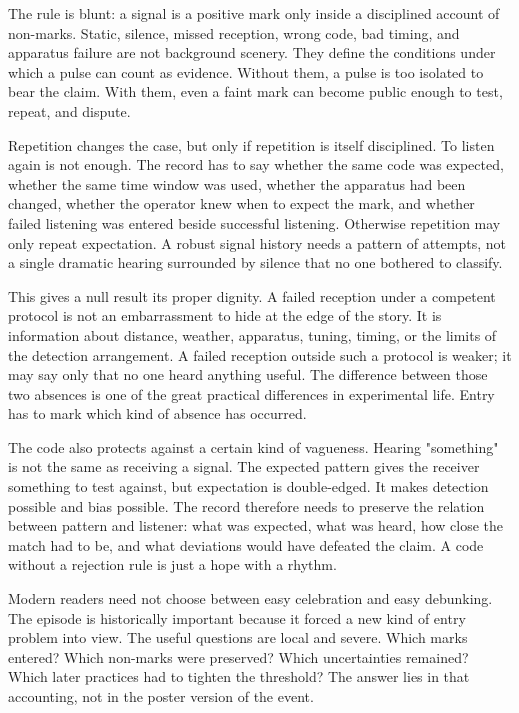 The rule is blunt: a signal is a positive mark only inside a disciplined
account of non-marks. Static, silence, missed reception, wrong code, bad
timing, and apparatus failure are not background scenery. They define the
conditions under which a pulse can count as evidence. Without them, a
pulse is too isolated to bear the claim. With them, even a faint mark can become public enough to test, repeat,
and dispute.

Repetition changes the case, but only if repetition is itself disciplined. To
listen again is not enough. The record has to say whether the same code was
expected, whether the same time window was used, whether the apparatus had been
changed, whether the operator knew when to expect the mark, and whether failed
listening was entered beside successful listening. Otherwise repetition may
only repeat expectation. A robust signal history needs a pattern of attempts,
not a single dramatic hearing surrounded by silence that no one bothered to
classify.

This gives a null result its proper dignity. A failed reception under a
competent protocol is not an embarrassment to hide at the edge of the story. It
is information about distance, weather, apparatus, tuning, timing, or the
limits of the detection arrangement. A failed reception outside such a protocol
is weaker; it may say only that no one heard anything useful. The difference
between those two absences is one of the great practical differences in
experimental life. Entry has to mark which kind of absence has occurred.

The code also protects against a certain kind of vagueness. Hearing "something"
is not the same as receiving a signal. The expected pattern gives the receiver
something to test against, but expectation is double-edged. It makes detection
possible and bias possible. The record therefore needs to preserve the relation
between pattern and listener: what was expected, what was heard, how
close the match had to be, and what deviations would have defeated the
claim. A code
without a rejection rule is just a hope with a rhythm.

Modern readers need not choose between easy celebration and easy
debunking. The
episode is historically important because it forced a new kind of entry problem
into view. The useful questions are local and severe. Which marks entered?
Which non-marks were preserved? Which uncertainties remained? Which later
practices had to tighten the threshold? The answer lies in that accounting,
not in the poster version of the event.

